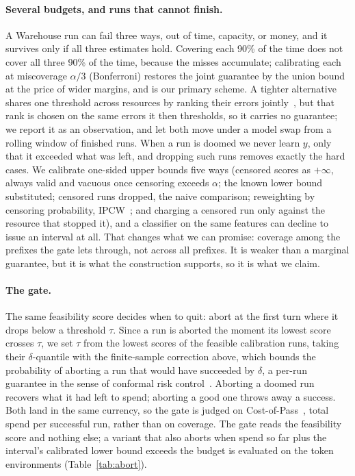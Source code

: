 \documentclass{article}
\begin{document}
\paragraph{Several budgets, and runs that cannot finish.}
A Warehouse run can fail three ways, out of time, capacity, or money, and it survives only if all three estimates hold. Covering each 90\% of the time does not cover all three 90\% of the time, because the misses accumulate; calibrating each at miscoverage $\alpha/3$ (Bonferroni) restores the joint guarantee by the union bound at the price of wider margins, and is our primary scheme. A tighter alternative shares one threshold across resources by ranking their errors jointly~\cite{messoudi2021copula}, but that rank is chosen on the same errors it then thresholds, so it carries no guarantee; we report it as an observation, and let both move under a model swap from a rolling window of finished runs. When a run is doomed we never learn $y$, only that it exceeded what was left, and dropping such runs removes exactly the hard cases. We calibrate one-sided upper bounds five ways (censored scores as $+\infty$, always valid and vacuous once censoring exceeds $\alpha$; the known lower bound substituted; censored runs dropped, the naive comparison; reweighting by censoring probability, IPCW~\cite{robins1992recovery,gui2024conformalized}; and charging a censored run only against the resource that stopped it), and a classifier on the same features can decline to issue an interval at all. That changes what we can promise: coverage among the prefixes the gate lets through, not across all prefixes. It is weaker than a marginal guarantee, but it is what the construction supports, so it is what we claim.

\paragraph{The gate.}
The same feasibility score decides when to quit: abort at the first turn where it drops below a threshold $\tau$. Since a run is aborted the moment its lowest score crosses $\tau$, we set $\tau$ from the lowest scores of the feasible calibration runs, taking their $\delta$-quantile with the finite-sample correction above, which bounds the probability of aborting a run that would have succeeded by $\delta$, a per-run guarantee in the sense of conformal risk control~\cite{angelopoulos2024crc}. Aborting a doomed run recovers what it had left to spend; aborting a good one throws away a success. Both land in the same currency, so the gate is judged on Cost-of-Pass~\cite{erol2026costofpass}, total spend per successful run, rather than on coverage. The gate reads the feasibility score and nothing else; a variant that also aborts when spend so far plus the interval's calibrated lower bound exceeds the budget is evaluated on the token environments (Table~\ref{tab:abort}).
\end{document}
